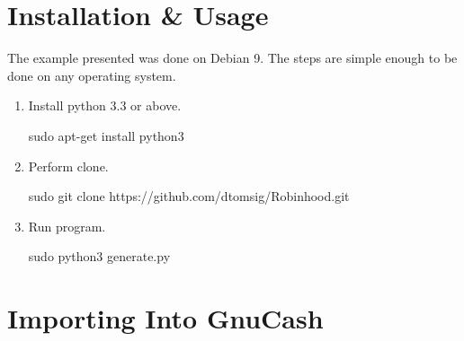 \documentclass{article}
\begin{document}
        \section{Installation \& Usage}
            The example presented was done on Debian 9. The steps are simple 
            enough to be done on any operating system.
            \newline
            \begin{enumerate}
                \item
                    Install python 3.3 or above.
                    \newline  
                    \begin{tcolorbox}[colback = cyan] 
                        sudo apt-get install python3
                    \end{tcolorbox}
                \item
                    Perform clone.
                    \newline  
                    \begin{tcolorbox}[colback = cyan] 
                        sudo git clone https://github.com/dtomsig/Robinhood.git
                    \end{tcolorbox}
                \item
                    Run program.
                    \newline  
                    \begin{tcolorbox}[colback = cyan] 
                        sudo python3 generate.py
                    \end{tcolorbox}
            \end{enumerate}
        \newpage
        \section{Importing Into GnuCash}
    
\end{document}
